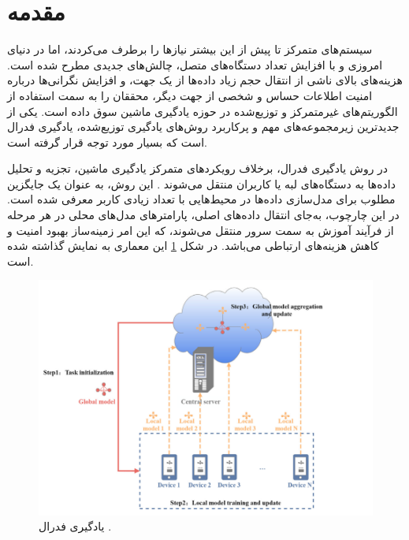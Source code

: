 
\section{مقدمه}

سیستم‌های متمرکز تا پیش از این بیشتر نیازها را برطرف می‌کردند، اما در دنیای امروزی و با افزایش تعداد دستگاه‌های متصل، چالش‌های جدیدی مطرح شده است. هزینه‌های بالای ناشی از انتقال حجم زیاد داده‌ها از یک جهت، و افزایش نگرانی‌ها درباره امنیت اطلاعات حساس و شخصی از جهت دیگر، محققان را به سمت استفاده از الگوریتم‌های غیرمتمرکز و توزیع‌شده در حوزه یادگیری ماشین سوق داده است. یکی از جدیدترین زیرمجموعه‌های مهم و پرکاربرد روش‌های یادگیری توزیع‌شده، یادگیری فدرال است که بسیار مورد توجه قرار گرفته است.


در روش یادگیری فدرال، برخلاف رویکردهای متمرکز یادگیری ماشین، تجزیه و تحلیل داده‌ها به دستگاه‌های لبه%
یا کاربران%
منتقل می‌شوند
\cite{ma2022state}.
این روش، به عنوان یک جایگزین مطلوب برای مدل‌سازی داده‌ها در محیط‌هایی با تعداد زیادی کاربر معرفی شده است. در این چارچوب، به‌جای انتقال داده‌های اصلی، پارامترهای مدل‌های محلی در هر مرحله از فرآیند آموزش به سمت سرور منتقل می‌شوند، که این امر زمینه‌ساز بهبود امنیت و کاهش هزینه‌های ارتباطی می‌باشد.
در شکل
\ref{federated_learning}
این معماری به نمایش گذاشته شده است.

\begin{figure}[t]
	\centering
	\includegraphics[scale=0.595]{images/chap1/federated_learning.png}%
	\caption{%
		یادگیری فدرال 
		\cite{ma2022state}%
		.
	}
	\label{federated_learning}
	\centering
\end{figure}

